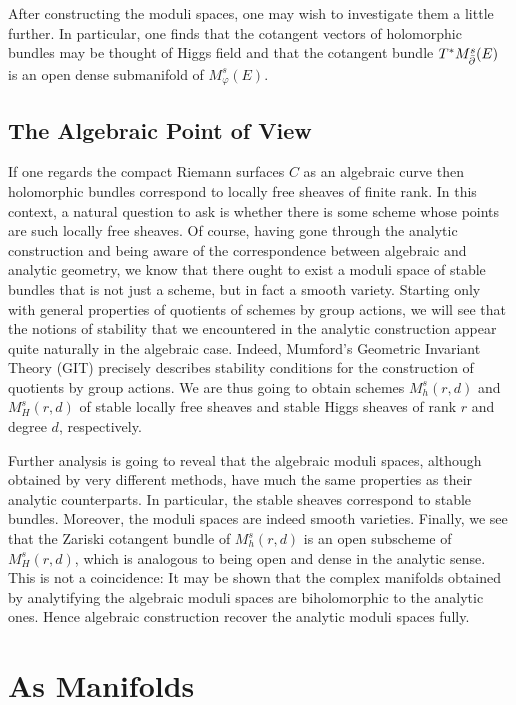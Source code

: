 \documentclass[12pt]{ociamthesis}  %
\begin{document}
After constructing the moduli spaces, one may wish to investigate
them a little further. In particular, one finds that the cotangent
vectors of holomorphic bundles may be thought of Higgs field and that
the cotangent bundle $T^* M^s_{\bar{\partial}}(E)$ is an open dense submanifold
of $M^s_\varphi(E)$.

\section{The Algebraic Point of View}

If one regards the compact Riemann surfaces $C$ as an algebraic curve
then holomorphic bundles correspond to locally free sheaves of finite
rank. In this context, a natural question to ask is whether there is
some scheme whose points are such locally free sheaves. Of course,
having gone through the analytic construction and being aware of
the correspondence between algebraic and analytic geometry, we know
that there ought to exist a moduli space of stable bundles that is not
just a scheme, but in fact a smooth variety. Starting only with
general properties of quotients of schemes by group actions, we will
see that the notions of stability that we encountered in the analytic
construction appear quite naturally in the algebraic case. Indeed,
Mumford's Geometric Invariant Theory (GIT) \cite{mumford1994}
precisely describes stability conditions for the construction of quotients
by group actions.
We are thus going to obtain schemes $M^s_h(r,d)$ and $M^s_H(r,d)$
of stable locally free sheaves and stable Higgs sheaves of rank $r$ and
degree $d$, respectively.

Further analysis is going to reveal that the algebraic moduli spaces,
although obtained by very different methods, have much the same
properties as their analytic counterparts. In particular, the stable
sheaves correspond to stable bundles. Moreover, the moduli spaces
are indeed smooth varieties. Finally, we see that the Zariski cotangent
bundle of $M^s_h(r,d)$ is an open subscheme of $M^s_H(r,d)$, which
is analogous to being open and dense in the analytic sense. This is
not a coincidence: It may be shown that the complex manifolds obtained
by analytifying the algebraic moduli spaces are biholomorphic to
the analytic ones. Hence algebraic construction recover the analytic
moduli spaces fully.

\chapter{As Manifolds}
\end{document}
